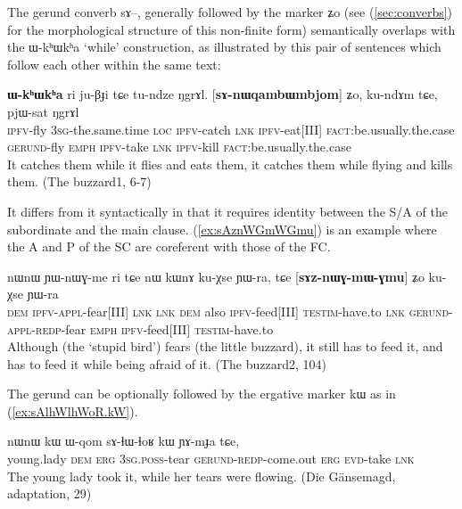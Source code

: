 \documentclass[oldfontcommands,oneside,a4paper,11pt]{article}
\newcommand{\ipa}[1]{{\phon \mbox{#1}}} %
\newcommand{\refb}[1]{(\ref{#1})}
\begin{document}
The gerund converb \ipa{sɤ}--, generally followed by the marker \ipa{ʑo} (see \refb{sec:converbs} for the morphological structure of this non-finite form)   semantically overlaps with the \ipa{ɯ-kʰɯkʰa} `while' construction, as illustrated by this pair of sentences which follow each other within the same text:

\begin{exe}
\ex \label{ex:sanWqambWmbjom}
\gll [\ipa{ɲɯ-nɯqambɯmbjom}]  \textbf{	\ipa{ɯ-kʰɯkʰa}}  	\ipa{ri}  	\ipa{ju-βɟi}  	\ipa{tɕe}  	\ipa{tu-ndze}  	\ipa{ŋgrɤl.}  	[\textbf{\ipa{sɤ-nɯqambɯmbjom}}]  	\ipa{ʑo,}  	\ipa{ku-ndɤm}  	\ipa{tɕe,}  	\ipa{pjɯ-sat}  	\ipa{ŋgrɤl}  \\
\textsc{ipfv}-fly \textsc{3sg}-the.same.time \textsc{loc} \textsc{ipfv}-catch \textsc{lnk} \textsc{ipfv}-eat[III] \textsc{fact}:be.usually.the.case 
\textsc{gerund}-fly \textsc{emph}
\textsc{ipfv}-take \textsc{lnk} \textsc{ipfv}-kill \textsc{fact}:be.usually.the.case 
\\
\glt It catches them while it flies and eats them, it catches them while flying and kills them. (The buzzard1, 6-7)
\end{exe} 

It differs from it syntactically in that it requires identity between the   S/A of the subordinate and the main clause. \refb{ex:sAznWGmWGmu} is an example where the A and P of the SC are coreferent with those of the FC.

\begin{exe}
\ex \label{ex:sAznWGmWGmu}
\gll
 	\ipa{nɯnɯ}  	\ipa{ɲɯ-nɯɣ-me}  	\ipa{ri} \ipa{tɕe} 	\ipa{nɯ}  	\ipa{kɯnɤ}  	\ipa{ku-χse}  	\ipa{ɲɯ-ra,}  	\ipa{tɕe}  	[\textbf{\ipa{sɤz-nɯɣ-mɯ-ɣmu}}]  	\ipa{ʑo}  	\ipa{ku-χse}  	\ipa{ɲɯ-ra}  \\
 	\textsc{dem} \textsc{ipfv-appl}-fear[III] \textsc{lnk}  \textsc{lnk} \textsc{dem} also \textsc{ipfv}-feed[III] \textsc{testim}-have.to \textsc{lnk} \textsc{gerund-appl-redp}-fear \textsc{emph} \textsc{ipfv}-feed[III] \textsc{testim}-have.to \\
 	\glt Although (the `stupid bird') fears (the little buzzard), it still has to feed it, and has to feed it while being afraid of it. (The buzzard2, 104)
\end{exe}

The gerund can be optionally followed by the ergative marker \ipa{kɯ} as in \refb{ex:sAlhWlhWoR.kW}.

\begin{exe}
\ex \label{ex:sAlhWlhWoR.kW}
\gll \ipa{tɤʑi} 	\ipa{nɯnɯ} 	\ipa{kɯ} 	\ipa{ɯ-qom} 	\ipa{sɤ-ɬɯ-ɬoʁ} 	\ipa{kɯ} 	\ipa{ɲɤ-mɟa} 	\ipa{tɕe,} \\
young.lady \textsc{dem} \textsc{erg} \textsc{3sg.poss}-tear \textsc{gerund-redp}-come.out \textsc{erg} \textsc{evd}-take \textsc{lnk} \\
\glt The young lady took it, while her tears were flowing. (Die Gänsemagd, adaptation, 29)
\end{exe}
\end{document}
